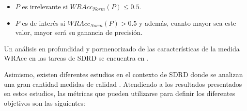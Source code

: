 \documentclass[c5paper,10pt,twoside]{book}	   	%
\begin{document}
\begin{itemize}
	\item $P$ es irrelevante si $WRAcc_{Norm}(P) \leq 0.5$.
	\item $P$ es de interés si $WRAcc_{Norm}(P) > 0.5$ y además, cuanto mayor sea este valor, mayor será su ganancia de precisión.
\end{itemize}

Un análisis en profundidad y pormenorizado de las características de la medida WRAcc en las tareas de \ac{SDRD} se encuentra en \cite{Cdh18}.

Asimismo, existen diferentes estudios en el contexto de \ac{SDRD} donde se analizan una gran cantidad medidas de calidad \cite{Glmc13,Glmc17}. Atendiendo a los resultados presentados en estos estudios, las métricas que pueden utilizarse para definir los diferentes objetivos son las siguientes: 
\end{document}
